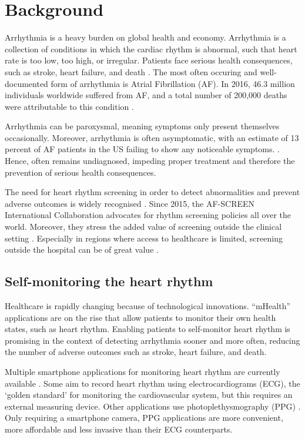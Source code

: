 \documentclass[twocolumn]{bmcart}%
\begin{document}
\section*{Background}
Arrhythmia is a heavy burden on global health and economy. 
Arrhythmia is a collection of conditions in which the cardiac rhythm is abnormal, such that heart rate is too low, too high, or irregular.
Patients face serious health consequences, such as stroke, heart failure, and death \cite{KhurshidShaan2018}.  
The most often occuring and well-documented form of arrhythmia is Atrial Fibrillation (AF).
In 2016, 46.3 million individuals worldwide suffered from AF, and a total number of 200,000 deaths were attributable to this condition \cite{BenjaminEmeliaJ.2019}. 

Arrhythmia can be paroxysmal, meaning symptoms only present themselves occasionally.  
Moreover, arrhythmia is often asymptomatic, with an estimate of 13 percent of AF patients in the US failing to show any noticeable symptoms. \cite{BenjaminEmeliaJ.2019}. 
Hence, often remains undiagnosed, impeding proper treatment and therefore the prevention of serious health consequences. 

The need for heart rhythm screening in order to detect abnormalities and prevent adverse outcomes is widely recognised \cite{BenjaminEmeliaJ.2019}. 
Since 2015, the AF-SCREEN International Collaboration advocates for rhythm screening policies all over the world.
Moreover, they stress the added value of screening outside the clinical setting \cite{Freedman2017}. 
Especially in regions where access to healthcare is limited, screening outside the hospital can be of great value \cite{Chugh2014}. 

\subsection*{Self-monitoring the heart rhythm}
Healthcare is rapidly changing because of technological innovations.
``mHealth'' applications are on the rise that allow patients to monitor their own health states, such as heart rhythm. 
Enabling patients to self-monitor heart rhythm is promising in the context of detecting arrhythmia sooner and more often, reducing the number of adverse outcomes such as stroke, heart failure, and death.

Multiple smartphone applications for monitoring heart rhythm are currently available \cite{Li2019}.
Some aim to record heart rhythm using electrocardiograms (ECG), the `golden standard' for monitoring the cardiovascular system, but this requires an external measuring device. \cite{Evans2017} 
Other applications use photoplethysmography (PPG) \cite{Tamura2019, Tamura2014}.
Only requiring a smartphone camera, PPG applications are more convenient, more affordable and less invasive than their ECG counterparts. 
\end{document}
